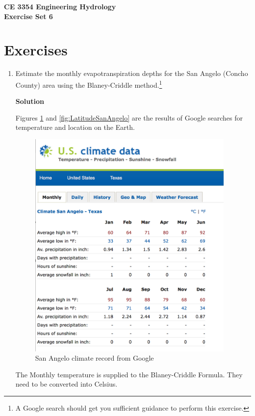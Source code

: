 \documentclass[12pt]{article}
\begin{document}
\begin{center}
{\textbf{{ CE 3354 Engineering Hydrology} \\ {Exercise Set 6}}}
\end{center}

 \section*{\small{Exercises}}
 \begin{enumerate}

\item Estimate the monthly evapotranspiration depths for the San Angelo (Concho County) area using the Blaney-Criddle method.\footnote{A Google search should get you sufficient guidance to perform this exercise.}

\textbf{Solution}

Figures \ref{fig:MeanMonthlySanAngelo} and \ref{fig:LatitudeSanAngelo} are the results of Google searches for temperature and location on the Earth.

\begin{figure}[htbp] %
   \centering
   \includegraphics[width=4in]{MeanMonthlySanAngelo.jpg} 
   \caption{San Angelo climate record from Google}
   \label{fig:MeanMonthlySanAngelo}
\end{figure}

The Monthly temperature is supplied to the Blaney-Criddle Formula.   They need to be converted into Celsius.


\end{enumerate}
\end{document}
